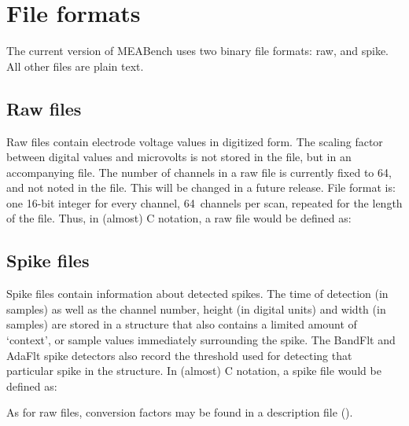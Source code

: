 \documentclass[12pt,oneside]{book}
\def\meabench{{MEABench}\xspace}
\def\streamtype#1{{\sc #1}\xspace}
\def\raw{\streamtype{raw}}
\def\spike{\streamtype{spike}}
\begin{document}
\chapter{File formats}

The current version of \meabench uses two binary file formats: \raw,
and \spike. All other files are plain text.

\section{Raw files}

Raw files contain electrode voltage values in digitized form. The
scaling factor between digital values and microvolts is not stored in
the  file, but in an accompanying  file.
The number of channels in a raw file is currently fixed to 64, and not
noted in the  file. This will be changed in a future
release. File format is: one 16-bit integer for every channel,
64~channels per scan, repeated for the length of the file. Thus, in (almost) C
notation, a raw file would be defined as:
\begin{quotation}
\end{quotation}

\section{Spike files}

Spike files contain information about detected spikes. The time of
detection (in samples) as well as the channel number, height (in
digital units) and width (in samples) are stored in a structure that
also contains a limited amount of `context', or sample values
immediately surrounding the spike. The BandFlt and AdaFlt spike
detectors also record the threshold used for detecting that particular
spike in the structure. In (almost) C notation, a spike file would be
defined as:
\begin{quotation}
\end{quotation}
As for raw files, conversion factors may be found in a description
file ().
\end{document}

